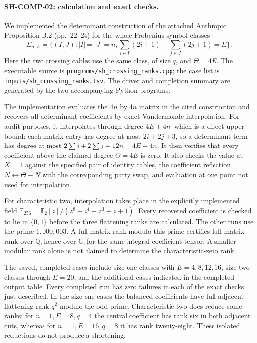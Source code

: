 \paragraph{SH-COMP-02: calculation and exact checks.}
We implemented the determinant construction of the attached Anthropic
Proposition B.2 (pp.~22--24) for the whole Frobenius-symbol classes
\[
 \Sigma_{n,E}=\{(I,J):|I|=|J|=n,
       \sum_{i\in I}(2i+1)+\sum_{j\in J}(2j+1)=E\}.
\]
Here the two crossing cables use the same class, of size $q$, and
$\Theta=4E$.  The executable source is
\texttt{programs/sh\_crossing\_ranks.cpp}; the case list is
\texttt{inputs/sh\_crossing\_ranks.tsv}.  The driver and completion
summary are generated by the two accompanying Python programs.

The implementation evaluates the $4n$ by $4n$ matrix in the cited
construction and recovers all determinant coefficients by exact
Vandermonde interpolation.  For audit purposes, it interpolates through
degree $4E+4n$, which is a direct upper bound: each matrix entry has
degree at most $2i+2j+3$, so a determinant term has degree at most
$2\sum i+2\sum j+12n=4E+4n$.  It then verifies that every coefficient
above the claimed degree $\Theta=4E$ is zero.  It also checks the value
at $X=1$ against the specified pair of identity cables, the coefficient
reflection $N\leftrightarrow\Theta-N$ with the corresponding party
swap, and evaluation at one point not used for interpolation.

For characteristic two, interpolation takes place in the explicitly
implemented field $\mathbb F_{256}=\mathbb F_2[z]/(z^8+z^4+z^3+z+1)$.
Every recovered coefficient is checked to lie in $\{0,1\}$ before
the three flattening ranks are calculated.  The other runs use the
prime $1{,}000{,}003$.  A full matrix rank modulo this prime certifies
full matrix rank over $\mathbb Q$, hence over $\mathbb C$, for the
same integral coefficient tensor.  A smaller modular rank alone is
not claimed to determine the characteristic-zero rank.

The saved, completed cases include size-one classes with
$E=4,8,12,16$, size-two classes through $E=20$, and the additional
cases indicated in the completed-output table.  Every completed run
has zero failures in each of the exact checks just described.  In the
size-one cases the balanced coefficients have full adjacent-flattening
rank $q^2$ modulo the odd prime.  Characteristic two does reduce some
ranks: for $n=1,E=8,q=4$ the central coefficient has rank six in both
adjacent cuts, whereas for $n=1,E=16,q=8$ it has rank twenty-eight.
These isolated reductions do not produce a shortening.

